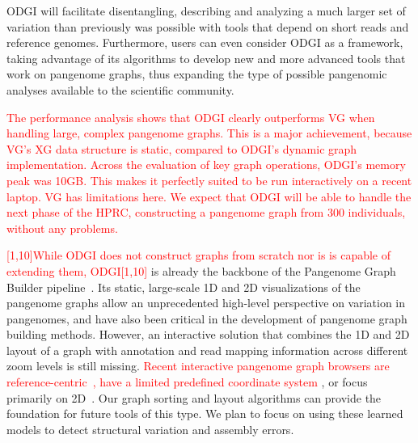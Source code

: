 \documentclass{bioinfo}
\newcommand{\REVIEWED}[1]{{\textcolor{Red}{#1}}}
\begin{document}
ODGI will facilitate disentangling,
describing and analyzing a much larger set of variation than previously was possible with tools that depend on short reads and reference genomes.
Furthermore, users can even consider ODGI as a framework, taking advantage of its algorithms to develop new and more advanced tools that work on pangenome graphs,
thus expanding the type of possible pangenomic analyses available to the scientific community.

\REVIEWED{The performance analysis shows that ODGI clearly outperforms VG when handling large, complex pangenome graphs. This is a major achievement, because VG's XG data structure is static, compared to ODGI's dynamic graph implementation. Across the evaluation of key graph operations, ODGI's memory peak was 10GB. This makes it perfectly suited to be run interactively on a recent laptop. VG has limitations here. We expect that ODGI will be able to handle the next phase of the HPRC, constructing a pangenome graph from 300 individuals, without any problems.}

\REVIEWED{[1,10]While ODGI does not construct graphs from scratch nor is is capable of extending them, ODGI[1,10]} is already the backbone of the Pangenome Graph Builder pipeline~\citep{pggb}.
Its static, large-scale 1D and 2D visualizations of the pangenome graphs allow an unprecedented high-level perspective on variation in pangenomes, and have also been critical in the development of pangenome graph building methods.  %
However, an interactive solution that combines the 1D and 2D layout of a graph with annotation and read mapping information across different zoom levels is still missing.
\REVIEWED{Recent interactive pangenome graph browsers are reference-centric~\citep{Beyer2019, Yokoyama2019}, have a limited predefined coordinate system \citep{Durant2021}}, or focus primarily on 2D~\citep{Wick_2015, Gonnella2018}.
Our graph sorting and layout algorithms can provide the foundation for future tools of this type.
We plan to focus on using these learned models to detect structural variation and assembly errors.
\end{document}
